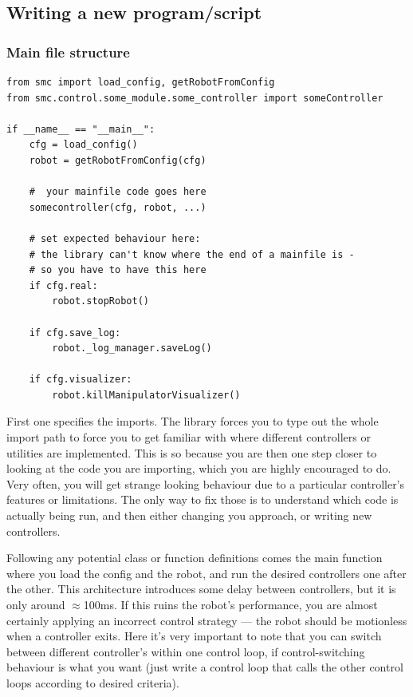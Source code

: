 \subsection{Writing a new program/script}
\subsubsection{Main file structure}
\begin{verbatim}
from smc import load_config, getRobotFromConfig
from smc.control.some_module.some_controller import someController

if __name__ == "__main__":
    cfg = load_config()
    robot = getRobotFromConfig(cfg)

    #  your mainfile code goes here
    somecontroller(cfg, robot, ...)

    # set expected behaviour here:
    # the library can't know where the end of a mainfile is - 
    # so you have to have this here
    if cfg.real:
        robot.stopRobot()

    if cfg.save_log:
        robot._log_manager.saveLog()

    if cfg.visualizer:
        robot.killManipulatorVisualizer()
\end{verbatim}

First one specifies the imports. The library forces you to type out the 
whole import path
to force you to get familiar with where different controllers or 
utilities are implemented.
This is so because you are then one step closer to 
looking at the code you are importing,
which you are highly encouraged to do.
Very often, you will get strange looking behaviour due to a 
particular controller's features or limitations.
The only way to fix those is to understand which code is actually being run,
and then either changing you approach, or writing new controllers.

Following any potential class or function definitions comes the main
function where you load the config and the robot, 
and run the desired controllers one after the other.
This architecture introduces some delay between controllers,
but it is only around $\approx$100ms.
If this ruins the robot's performance, you are almost
certainly applying an incorrect control strategy ---
the robot should be motionless when a controller exits.
Here it's very important to note that you can switch 
between different controller's within one control loop,
if control-switching behaviour is what you want
(just write a control loop that calls the other control loops 
according to desired criteria).


